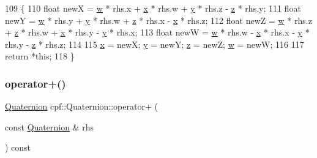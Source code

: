 \begin{DoxyCode}
109                                                       \{
110             \textcolor{keywordtype}{float} newX = \hyperlink{classcpf_1_1_quaternion_af312a196b39bb4903b876bc454ac15f8}{w} * rhs.x + \hyperlink{classcpf_1_1_quaternion_a200f7bce4e673281af8cc7dd75cb0677}{x} * rhs.w + \hyperlink{classcpf_1_1_quaternion_a4fbade6e58be55a49c94e7f157988136}{y} * rhs.z - \hyperlink{classcpf_1_1_quaternion_ade9c41b717605118e5fdf95d96a843b4}{z} * rhs.y;
111             \textcolor{keywordtype}{float} newY = \hyperlink{classcpf_1_1_quaternion_af312a196b39bb4903b876bc454ac15f8}{w} * rhs.y + \hyperlink{classcpf_1_1_quaternion_a4fbade6e58be55a49c94e7f157988136}{y} * rhs.w + \hyperlink{classcpf_1_1_quaternion_ade9c41b717605118e5fdf95d96a843b4}{z} * rhs.x - \hyperlink{classcpf_1_1_quaternion_a200f7bce4e673281af8cc7dd75cb0677}{x} * rhs.z;
112             \textcolor{keywordtype}{float} newZ = \hyperlink{classcpf_1_1_quaternion_af312a196b39bb4903b876bc454ac15f8}{w} * rhs.z + \hyperlink{classcpf_1_1_quaternion_ade9c41b717605118e5fdf95d96a843b4}{z} * rhs.w + \hyperlink{classcpf_1_1_quaternion_a200f7bce4e673281af8cc7dd75cb0677}{x} * rhs.y - \hyperlink{classcpf_1_1_quaternion_a4fbade6e58be55a49c94e7f157988136}{y} * rhs.x;
113             \textcolor{keywordtype}{float} newW = \hyperlink{classcpf_1_1_quaternion_af312a196b39bb4903b876bc454ac15f8}{w} * rhs.w - \hyperlink{classcpf_1_1_quaternion_a200f7bce4e673281af8cc7dd75cb0677}{x} * rhs.x - \hyperlink{classcpf_1_1_quaternion_a4fbade6e58be55a49c94e7f157988136}{y} * rhs.y - \hyperlink{classcpf_1_1_quaternion_ade9c41b717605118e5fdf95d96a843b4}{z} * rhs.z;
114 
115             \hyperlink{classcpf_1_1_quaternion_a200f7bce4e673281af8cc7dd75cb0677}{x} = newX; \hyperlink{classcpf_1_1_quaternion_a4fbade6e58be55a49c94e7f157988136}{y} = newY; \hyperlink{classcpf_1_1_quaternion_ade9c41b717605118e5fdf95d96a843b4}{z} = newZ; \hyperlink{classcpf_1_1_quaternion_af312a196b39bb4903b876bc454ac15f8}{w} = newW;
116 
117             \textcolor{keywordflow}{return} *\textcolor{keyword}{this};
118         \}
\end{DoxyCode}
\mbox{\label{classcpf_1_1_quaternion_a9e55ee3dded0a62bd7374bd058c51ec9}} 
\subsubsection{\texorpdfstring{operator+()}{operator+()}}
{\footnotesize\ttfamily \hyperlink{classcpf_1_1_quaternion}{Quaternion} cpf\+::\+Quaternion\+::operator+ (\begin{DoxyParamCaption}\item[{const \hyperlink{classcpf_1_1_quaternion}{Quaternion} \&}]{rhs }\end{DoxyParamCaption}) const\hspace{0.3cm}{\ttfamily [inline]}}



